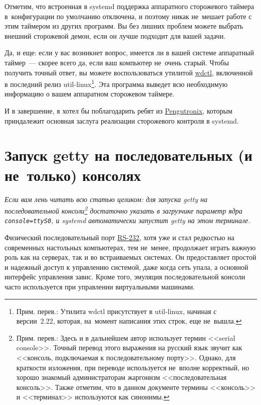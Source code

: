 \documentclass[10pt,oneside,a4paper]{article}
\begin{document}
Отметим, что встроенная в systemd поддержка аппаратного сторожевого таймера
в~конфигурации по умолчанию отключена, и поэтому никак не~мешает работе с этим
таймером из других программ. Вы без лишних проблем можете выбрать внешний
сторожевой демон, если он лучше подходит для вашей задачи.

Да, и еще: если у вас возникнет вопрос, имеется ли в вашей системе аппаратный
таймер~--- скорее всего да, если ваш компьютер не~очень старый. Чтобы получить
точный ответ, вы можете воспользоваться утилитой
\href{http://karelzak.blogspot.de/2012/05/eject1-sulogin1-wdctl1.html}{wdctl},
включенной в последний релиз util-linux\footnote{Прим. перев.: Утилита wdctl
присутствует в util-linux, начиная с версии~2.22, которая, на~момент написания
этих строк, еще не~вышла.}. Эта программа выведет всю необходимую
информацию о вашем аппаратном сторожевом таймере.

И в завершение, я хотел бы поблагодарить ребят из
\href{http://www.pengutronix.de/}{Pengutronix}, которым приндалежит основная
заслуга реализации сторожевого контроля в systemd.

\section{Запуск getty на последовательных (и не~только) консолях}
\label{sec:getty}

\emph{Если вам лень читать всю статью целиком: для запуска getty на
последовательной консоли\footnote{Прим. перев.: Здесь и в дальнейшем автор
использует термин <<serial console>>. Точный перевод этого выражения на русский
язык звучит как <<консоль, подключаемая к последовательному порту>>.  Однако,
для краткости изложения, при переводе используется не~вполне корректный, но
хорошо знакомый администраторам жаргонизм <<последовательная консоль>>. Также
отметим, что в данном документе термины <<консоль>> и <<терминал>> используются
как синонимы.} достаточно указать в загрузчике параметр ядра
\verb+console=ttyS0+, и systemd автоматически запустит getty на этом терминале.}

Физический последовательный порт 
\href{https://ru.wikipedia.org/wiki/RS-232}{RS-232}, хотя уже и стал редкостью
на современных настольных компьютерах, тем не~менее, продолжает играть важную
роль как на серверах, так и во встраиваемых системах. Он предоставляет простой и
надежный доступ к управлению системой, даже когда сеть упала, а основной
интерфейс управления завис. Кроме того, эмуляция последовательной консоли часто
используется при управлении виртуальными машинами.
\end{document}

